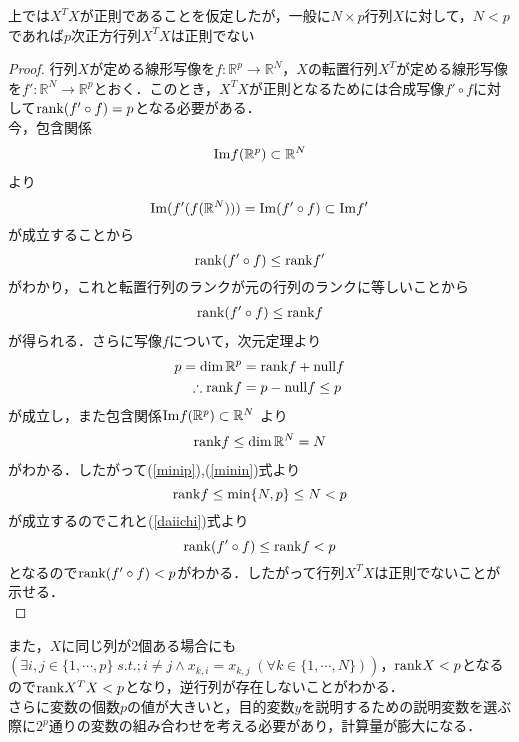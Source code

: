 \documentclass{jsarticle}
\theoremstyle{definition}
\begin{document}
上では$X^TX$が正則であることを仮定したが，一般に$N\times p$行列$X$に対して，$N<p$であれば$p$次正方行列$X^TX$は正則でない
\begin{proof}
行列$X$が定める線形写像を$f:\mathbb{R}^p\to\mathbb{R}^N$，$X$の転置行列$X^T$が定める線形写像を$f':\mathbb{R}^N\to \mathbb{R}^p$とおく．このとき，$X^T X$が正則となるためには合成写像$f'\circ f$に対して${\rm rank}(f'\circ f)=p$となる必要がある．\\
今，包含関係
\begin{align*}
{\rm Im}f(\mathbb{R}^p)\subset \mathbb{R}^N
\end{align*}
より
$${\rm Im}(f' (f(\mathbb{R}^N)))={\rm Im}(f'\circ f)\subset {\rm Im}f'$$
が成立することから
$${\rm rank}(f'\circ f)\leq {\rm rank}f'$$
がわかり，これと転置行列のランクが元の行列のランクに等しいことから
\begin{align}
\label{daiichi}
{\rm rank}(f'\circ f)\leq {\rm rank}f
\end{align}
が得られる．さらに写像$f$について，次元定理より
\begin{equation}
\begin{split}
\label{minip}
p=\dim \mathbb{R}^p&={\rm rank}f+{\rm null} f\\
\therefore {\rm rank}f&=p-{\rm null}f\leq p
\end{split}
\end{equation}
が成立し，また包含関係${\rm Im}f(\mathbb{R}^p)\subset \mathbb{R}^N$
より
\begin{align}
\label{minin}
{\rm rank}f\leq \dim \mathbb{R}^N= N
\end{align}
がわかる．したがって(\ref{minip}),(\ref{minin})式より
$${\rm rank}f\leq \min\{N,p\}\leq N<p$$
が成立するのでこれと(\ref{daiichi})式より
$${\rm rank}(f'\circ f)\leq {\rm rank}f<p$$
となるので${\rm rank}(f'\circ f)<p$がわかる．したがって行列$X^TX$は正則でないことが示せる．\\
\end{proof}
また，$X$に同じ列が2個ある場合にも$(\exists i,j\in\{1,\cdots,p\}\;s.t.; i\neq j\land x_{k,i}=x_{k,j}\;(\forall k\in \{1,\cdots, N\}))$，${\rm rank}X<p$となるので${\rm rank}X^TX<p$となり，逆行列が存在しないことがわかる．　\\
さらに変数の個数$p$の値が大きいと，目的変数$y$を説明するための説明変数を選ぶ際に$2^p$通りの変数の組み合わせを考える必要があり，計算量が膨大になる．\\
\end{document}
